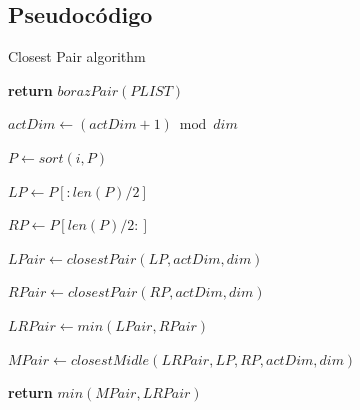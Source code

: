 \documentclass{article}
\begin{document}
	\subsection{Pseudocódigo}
		\begin{algorithm}

			\caption{Closest Pair algorithm}

			\label{euclid}

			\begin{algorithmic}[1] %

			
					
					\State \textbf{return}  $borazPair(PLIST)$

				\Else
					
					\State $actDim\gets(actDim+1) \bmod dim$ 	
					
					\State

					
					\State $P \gets sort(i, P)$
					
					\State
					
					\State $LP \gets P[:len(P)/2]$
					
					\State $RP \gets P[len(P)/2:]$
					
					\State
					
					\State $LPair \gets closestPair(LP, actDim, dim)$
					
					\State $RPair \gets closestPair(RP, actDim, dim)$
					
					\State $LRPair \gets min(LPair, RPair)$
					
					\State
					
					\State $MPair \gets closestMidle(LRPair, LP, RP, actDim, dim)$
					
					\State

					\State \textbf{return} $min(MPair, LRPair)$
				\EndIf
			
			\EndProcedure

			\end{algorithmic}

		\end{algorithm}
		
\end{document}
